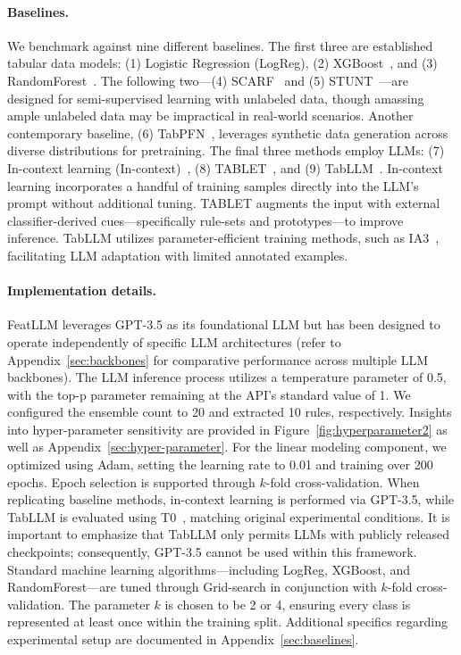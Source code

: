 \paragraph{Baselines.}
We benchmark against nine different baselines. The first three are established tabular data models: (1) Logistic Regression (LogReg), (2) XGBoost~\cite{chen2016xgboost}, and (3) RandomForest~\cite{ho1995random}. The following two—(4) SCARF~\cite{bahri2022scarf} and (5) STUNT~\cite{nam2023stunt}—are designed for semi-supervised learning with unlabeled data, though amassing ample unlabeled data may be impractical in real-world scenarios. Another contemporary baseline, (6) TabPFN~\cite{hollmann2022tabpfn}, leverages synthetic data generation across diverse distributions for pretraining. The final three methods employ LLMs: (7) In-context learning (In-context)~\cite{wei2022emergent}, (8) TABLET~\cite{slack2023tablet}, and (9) TabLLM~\cite{hegselmann2023tabllm}. In-context learning incorporates a handful of training samples directly into the LLM’s prompt without additional tuning. TABLET augments the input with external classifier-derived cues—specifically rule-sets and prototypes—to improve inference. TabLLM utilizes parameter-efficient training methods, such as IA3~\cite{liu2022few}, facilitating LLM adaptation with limited annotated examples.

\vspace*{-0.12in}
\paragraph{Implementation details.}
\textsf{FeatLLM} leverages GPT-3.5 as its foundational LLM but has been designed to operate independently of specific LLM architectures (refer to Appendix~\ref{sec:backbones} for comparative performance across multiple LLM backbones). The LLM inference process utilizes a temperature parameter of 0.5, with the top-p parameter remaining at the API's standard value of 1. We configured the ensemble count to 20 and extracted 10 rules, respectively. Insights into hyper-parameter sensitivity are provided in Figure~\ref{fig:hyperparameter2} as well as Appendix~\ref{sec:hyper-parameter}. For the linear modeling component, we optimized using Adam, setting the learning rate to 0.01 and training over 200 epochs. Epoch selection is supported through $k$-fold cross-validation. When replicating baseline methods, in-context learning is performed via GPT-3.5, while TabLLM is evaluated using T0~\cite{sanh2022multitask}, matching original experimental conditions. It is important to emphasize that TabLLM only permits LLMs with publicly released checkpoints; consequently, GPT-3.5 cannot be used within this framework. Standard machine learning algorithms—including LogReg, XGBoost, and RandomForest—are tuned through Grid-search in conjunction with $k$-fold cross-validation. The parameter $k$ is chosen to be 2 or 4, ensuring every class is represented at least once within the training split. Additional specifics regarding experimental setup are documented in Appendix~\ref{sec:baselines}.

